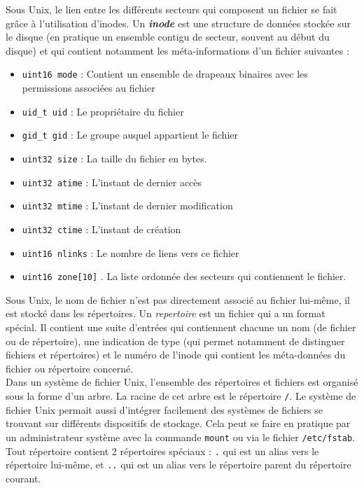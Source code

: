 Sous Unix, le lien entre les différents secteurs qui composent un fichier se fait grâce à l'utilisation d'inodes. Un \textit{\textbf{inode}} est une structure de données stockée sur le disque (en pratique un ensemble contigu de secteur, souvent au début du disque) et qui contient notamment les méta-informations d'un fichier suivantes :
\begin{itemize}
  \item \texttt{uint16 mode} : Contient un ensemble de drapeaux binaires avec les permissions associées au fichier
  \item \texttt{uid\_t uid} : Le propriétaire du fichier
  \item \texttt{gid\_t gid} : Le groupe auquel appartient le fichier
  \item \texttt{uint32 size} : La taille du fichier en bytes.
  \item \texttt{uint32 atime} : L'instant de dernier accès
  \item \texttt{uint32 mtime} : L'instant de dernier modification
  \item \texttt{uint32 ctime} : L'instant de création
  \item \texttt{uint16 nlinks} : Le nombre de liens vers ce fichier
  \item \texttt{uint16 zone[10]} . La liste ordonnée des secteurs qui contiennent le fichier.
\end{itemize}
Sous Unix, le nom de fichier n'est pas directement associé au fichier lui-même, il est stocké dans les répertoires. Un \textit{repertoire} est un fichier qui a un format spécial. Il contient une suite d'entrées qui contiennent chacune un nom (de fichier ou de répertoire), une indication de type (qui permet notamment de distinguer fichiers et répertoires) et le numéro de l'inode qui contient les méta-données du fichier ou répertoire concerné. \\

Dans un système de fichier Unix, l'ensemble des répertoires et fichiers est organisé sous la forme d'un arbre. La racine de cet arbre est le répertoire \texttt{/}. Le système de fichier Unix permait aussi d'intégrer facilement des systèmes de fichiers se trouvant sur différents dispositifs de stockage. Cela peut se faire en pratique par un administrateur système avec la commande \texttt{mount} ou via le fichier \texttt{/etc/fstab}. \\

Tout répertoire contient 2 répertoires spéciaux : \texttt{.} qui est un alias vers le répertoire lui-même, et \texttt{..} qui est un alias vers le répertoire parent du répertoire courant. \\

